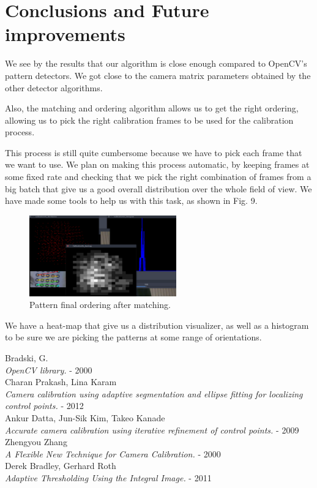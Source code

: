 \documentclass[journal]{IEEEtran}
\begin{document}
\section{Conclusions and Future improvements}
We see by the results that our algorithm is close enough compared to OpenCV's pattern detectors. We got close to the camera matrix parameters obtained by the other detector algorithms.

Also, the matching and ordering algorithm allows us to get the right ordering, allowing us to pick the right calibration frames to be used for the calibration process.

This process is still quite cumbersome because we have to pick each frame that we want to use. We plan on making this process automatic, by keeping frames at some fixed rate and checking that we pick the right combination of frames from a big batch that give us a good overall distribution over the whole field of view. We have made some tools to help us with this task, as shown in Fig. 9.

\begin{figure}[H]
\centering
\includegraphics[width=2.5in]{_img/tools.png}
\caption{Pattern final ordering after matching.}
\end{figure}

We have a heat-map that give us a distribution visualizer, as well as a histogram to be sure we are picking the patterns at some range of orientations.


\begin{thebibliography}{1}

  Bradski, G. \\
  \textit{OpenCV library.} - 2000
\\
  Charan Prakash, Lina Karam\\
  \textit{Camera calibration using adaptive segmentation and ellipse fitting for localizing control points.} - 2012
\\
  Ankur Datta, Jun-Sik Kim, Takeo Kanade\\
  \textit{Accurate camera calibration using iterative refinement of control points.} - 2009
\\
  Zhengyou Zhang \\
  \textit{A Flexible New Technique for Camera Calibration.} - 2000
\\
  Derek Bradley, Gerhard Roth \\
  \textit{Adaptive Thresholding Using the Integral Image.} - 2011

\end{thebibliography}
\end{document}
